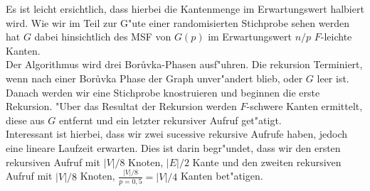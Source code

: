 \documentclass[a4paper,12pt,times,german]{cls/summary}
\begin{document}
    Es ist leicht ersichtlich, dass hierbei die Kantenmenge im Erwartungswert
    halbiert wird.
    Wie wir im Teil zur G"ute einer randomisierten Stichprobe sehen werden 
    hat $G$ dabei hinsichtlich des MSF von $G(p)$ im Erwartungswert $n/p$
    $F$-leichte Kanten.\\
Der Algorithmus wird drei Bor\r uvka-Phasen ausf"uhren.
    Die rekursion Terminiert, wenn nach einer Bor\r uvka Phase der Graph 
    unver"andert blieb, oder $G$ leer ist.
    Danach werden wir eine Stichprobe knostruieren und beginnen die erste
    Rekursion.
    "Uber das Resultat der Rekursion werden $F$-schwere Kanten ermittelt, 
    diese aus $G$ entfernt und ein letzter rekursiver Aufruf get"atigt.\\
Interessant ist hierbei, dass wir zwei sucessive rekursive Aufrufe haben, jedoch
    eine lineare Laufzeit erwarten.
    Dies ist darin begr"undet, dass wir den ersten rekursiven Aufruf mit 
    $|V|/8$ Knoten, $|E|/2$ Kante und den zweiten rekursiven Aufruf mit $|V|/8$ Knoten,
    $\frac{|V|/8}{p=0,5} = |V|/4$ Kanten bet"atigen.
    
\end{document}
